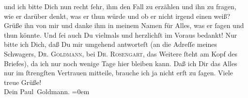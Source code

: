 \begin{ledgroupsized}[t]{13cm}
               und ich bitte Dich nun recht ſehr, ihm  den Fall zu erzählen und ihn zu fragen, wie er darüber denkt, was er thun
               würde und ob er nicht irgend einen \label{K_L03243-3v}\label{K_L03243-3h} weiß? Grüße ihn von mir und danke ihm in meinem Namen für Alles, was er ſagen
               und thun könnte. Und ſei auch Du vielmals und {\pb}herzlichſt im Voraus bedankt! Nur bitte ich Dich, daß Du mir umgehend antworteſt
               (an die Adreſſe meines Schwagers, \textsc{Dr. Goldmann}, bei \textsc{Dr. }{ }\textsc{Rosengart}, das Weitere ſteht am Kopf des Briefes), da ich nur noch wenige Tage hier bleiben kann.\pend
           \pstart
           Daß ich Dir das Alles nur im ſtrengſten Vertrauen mitteile, brauche ich ja nicht erſt
               zu ſagen.\pend
           \pstart
           Viele treue Grüße! {\\[\baselineskip]}Dein \spacefill\mbox{Paul Goldmann.}\pend
           \leftskip=0em{}
         
         \endnumbering{}\end{ledgroupsized}  \newcommand{\dateiname}{L03243}\newcommand{\titel}{Paul Goldmann an Arthur Schnitzler, 16. 4. [1906]}\newcommand{\editorInnen}{Martin Anton Müller und Laura Untner}
      